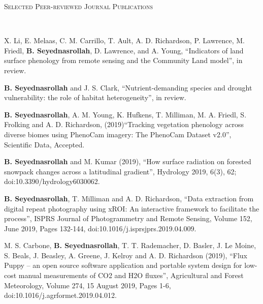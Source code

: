\documentclass[10pt]{article}
\newenvironment{changemargin}[2]{%
  \begin{list}{}{%
 \setlength{\topsep}{0pt}%
 \setlength{\leftmargin}{#1}%
 \setlength{\rightmargin}{#2}%
 \setlength{\listparindent}{\parindent}%
 \setlength{\itemindent}{\parindent}%
 \setlength{\parsep}{\parskip}%
  }%
  \item[]}{\end{list}
}
\newcommand{\lineover}{
  \begin{changemargin}{-0.05in}{-0.05in}
  \vspace*{-8pt}
  \hrulefill \\
  \vspace*{-2pt}
  \end{changemargin}
}
\newcommand{\header}[1]{
  \begin{changemargin}{-0.5in}{-0.5in}
  \scshape{#1}\\
  \lineover
  \end{changemargin}
}
\newenvironment{body} {
  \vspace*{-2pt}
  \begin{changemargin}{-0.5in}{-0.5in}
}
{\end{changemargin}
}
\begin{document}
\medskip
\header{Selected Peer-reviewed Journal Publications}

\begin{body}
  \begin{etaremune}


    \item X. Li, E. Melaas, C. M. Carrillo, T. Ault, A. D. Richardson, P. Lawrence, M. Friedl, \textbf{B. Seyednasrollah}, D. Lawrence, and A. Young, ``Indicators of land surface phenology from remote sensing and the Community Land model'', in review.\\
    \medskip
    
    \item \textbf{B. Seyednasrollah} and J. S. Clark, ``Nutrient-demanding species and drought vulnerability: the role of habitat heterogeneity'', in review.\\
    \medskip
  
    \item  \textbf{B. Seyednasrollah}, A. M. Young, K. Hufkens, T. Milliman, M. A. Friedl, S. Frolking and A. D. Richardson, (2019)``Tracking vegetation phenology across diverse biomes using PhenoCam imagery: The PhenoCam Dataset v2.0'', Scientific Data, Accepted.\\
    \medskip

        \item  \textbf{B. Seyednasrollah} and M. Kumar (2019), ``How surface radiation on forested snowpack changes across a latitudinal gradient'', Hydrology 2019, 6(3), 62; doi:10.3390/hydrology6030062.    \\
    \medskip

    \item \textbf{B. Seyednasrollah}, T. Milliman and A. D. Richardson, ``Data extraction from digital repeat photography using xROI: An interactive framework to facilitate the process'', ISPRS Journal of Photogrammetry and Remote Sensing, Volume 152, June 2019, Pages 132-144, doi:10.1016/j.isprsjprs.2019.04.009.\\
    \medskip

    \item M. S. Carbone, \textbf{B. Seyednasrollah}, T. T. Rademacher, D. Basler, J. Le Moine, S. Beals, J. Beasley, A. Greene, J. Kelroy and A. D. Richardson (2019), ``Flux Puppy – an open source software application and portable system design for low-cost manual measurements of CO2 and H2O fluxes'', Agricultural and Forest Meteorology, Volume 274, 15 August 2019, Pages 1-6, doi:10.1016/j.agrformet.2019.04.012.\\
    \medskip



\end{etaremune}
\end{body}
\end{document}
